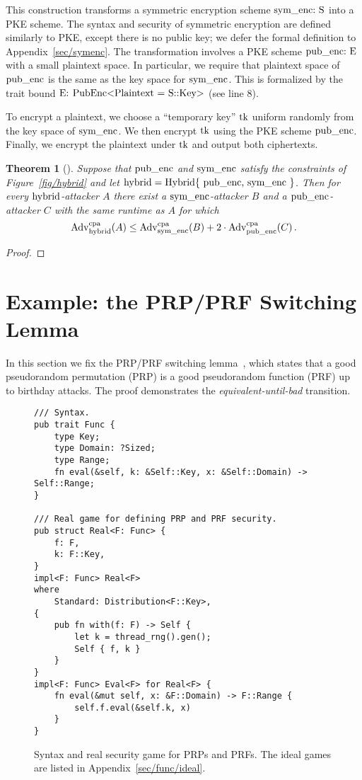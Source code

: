 \documentclass{article}
\newtheorem{theorem}{Theorem}
\newcommand{\Adv}[1]{\textrm{\textup{Adv}}^{\textup{#1}}}
\newcommand{\code}[1]{\textrm{\textup{\lstinline{#1}}}}
\begin{document}
This construction transforms a symmetric encryption scheme $\code{sym_enc: S}$
into a PKE scheme.
%
The syntax and security of symmetric encryption are defined similarly to PKE,
except there is no public key; we defer the formal definition to
Appendix~\ref{sec/symenc}.
%
The transformation involves a PKE scheme $\code{pub_enc: E}$ with a small
plaintext space. In particular, we require that plaintext space of
$\code{pub_enc}$ is the same as the key space for $\code{sym_enc}$. This is
formalized by the trait bound $\code{E: PubEnc<Plaintext = S::Key>}$ (see line
8).

To encrypt a plaintext, we choose a ``temporary key'' $\code{tk}$ uniform
randomly from the key space of $\code{sym_enc}$.
%
We then encrypt $\code{tk}$ using the PKE scheme $\code{pub_enc}$.
%
Finally, we encrypt the plaintext under $\code{tk}$ and output both
ciphertexts.

\begin{theorem}[{\cite[Claim~15.9]{joy}}]\label{thm/hybrid}
  Suppose that $\code{pub_enc}$ and $\code{sym_enc}$ satisfy the constraints of
  Figure~\ref{fig/hybrid} and let $\code{hybrid} = \code{Hybrid\{
    pub_enc, sym_enc \}}$.
  Then for every $\code{hybrid}$-attacker $A$ there exist a
  $\code{sym_enc}$-attacker $B$ and a $\code{pub_enc}$-attacker $C$ with
  the same runtime as $A$ for which
  \[
    \Adv{cpa}_\code{hybrid}(A) \leq
      \Adv{cpa}_\code{sym_enc}(B) +
      2\cdot\Adv{cpa}_\code{pub_enc}(C) \,.
  \]
\end{theorem}

\begin{proof}
  
\end{proof}


\section{Example: the PRP/PRF Switching Lemma}\label{sec/switching}

In this section we fix the PRP/PRF switching lemma~\cite{BR06}, which states
that a good pseudorandom permutation (PRP) is a good pseudorandom function
(PRF) up to birthday attacks.
%
The proof demonstrates the \emph{equivalent-until-bad} transition.

\begin{figure}[t]
\begin{lstlisting}
/// Syntax.
pub trait Func {
    type Key;
    type Domain: ?Sized;
    type Range;
    fn eval(&self, k: &Self::Key, x: &Self::Domain) -> Self::Range;
}

/// Real game for defining PRP and PRF security.
pub struct Real<F: Func> {
    f: F,
    k: F::Key,
}
impl<F: Func> Real<F>
where
    Standard: Distribution<F::Key>,
{
    pub fn with(f: F) -> Self {
        let k = thread_rng().gen();
        Self { f, k }
    }
}
impl<F: Func> Eval<F> for Real<F> {
    fn eval(&mut self, x: &F::Domain) -> F::Range {
        self.f.eval(&self.k, x)
    }
}
\end{lstlisting}
  \caption{Syntax and real security game for PRPs and PRFs. The ideal games are
  listed in Appendix~\ref{sec/func/ideal}.}
  \label{fig/func/syntax}
  \label{fig/func/real}
\end{figure}
\end{document}
